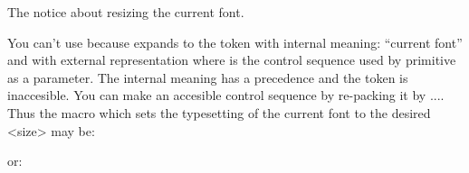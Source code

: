The notice about resizing the current font.

You can't use \expandafer \resizefont \the\font because \the\font expands to
the token with internal meaning: ``current font'' and with external
representation \fontselector where \fontselector is the control sequence
used by primitive \font as a parameter. The internal meaning has a
precedence and the token \the\font is inaccesible. You can make an accesible
control sequence by re-packing it by \csname...\endcsname. Thus the macro
 which sets the typesetting of the current font to the
desired <size> may be:

\def\currsize#1{%
  {\escapechar=-1\xdef\tmp{\csname\expandafter\string\the\font\endcsname}}%
  \def\sizespec{at#1}\expandafter\resizefont\tmp \tmp}

or:

\def\currsize#1{%
  \expandafter\let \expandafter\tmp \the\font
  \def\sizespec{at#1}\resizefont\tmp \tmp}



